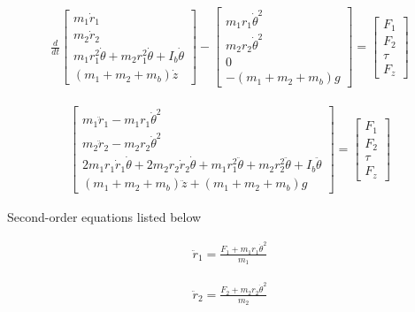 \documentclass{UoNMCHA}
\numberwithin{equation}{section}
\begin{document}
	\begin{align}
		\frac{d}{d t}\left[\begin{array}{c}
			m_{1} \dot{r}_{1} \\
			m_{2} \dot{r}_{2} \\
			m_{1} r_{1}^{2} \dot{\theta}+m_{2} r_{1}^{2} \dot{\theta}+I_{b} \dot{\theta} \\
			\left(m_{1}+m_{2}+m_{b}\right) \dot{z}
		\end{array}\right]-\left[\begin{array}{c}
			m_{1} r_{1} \dot{\theta}^{2} \\
			m_{2} r_{2} \dot{\theta}^{2} \\
			0 \\
			-\left(m_{1}+m_{2}+m_{b}\right) g
		\end{array}\right]=\left[\begin{array}{c}
			F_{1} \\
			F_{2} \\
			\tau \\
			F_{z}
	\end{array}\right]
	\end{align}

	\begin{align}
		\left[\begin{array}{l}
			m_{1} \ddot{r}_{1}-m_{1} r_{1} \dot{\theta}^{2} \\
			m_{2} \ddot{r}_{2}-m_{2} r_{2} \dot{\theta}^{2} \\
			2 m_{1} r_{1} \dot{r}_{1} \dot{\theta}+2 m_{2} r_{2} \dot{r}_{2} \dot{\theta}+m_{1} r_{1}^{2} \ddot{\theta}+m_{2} r_{2}^{2} \ddot{\theta}+I_{b} \ddot{\theta} \\
			\left(m_{1}+m_{2}+m_{b}\right) \ddot{z}+\left(m_{1}+m_{2}+m_{b}\right) g
		\end{array}\right]=\left[\begin{array}{c}
			F_{1} \\
			F_{2} \\
			\tau \\
			F_{z}
		\end{array}\right]
	\end{align}

Second-order equations listed below

	\begin{align}
\ddot{r}_{1}=\frac{F_{1}+m_{1} r_{1} \dot{\theta}^{2}}{m_{1}}
\end{align}

	\begin{align}
\ddot{r}_{2}=\frac{F_{2}+m_{2} r_{2} \dot{\theta}^{2}}{m_{2}}
\end{align}
\end{document}
